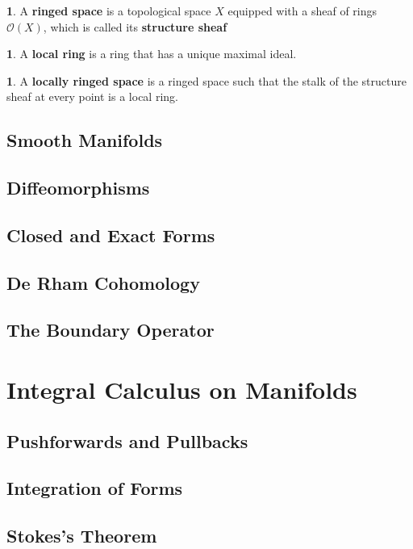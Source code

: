\documentclass[oneside,english]{amsbook}
\numberwithin{section}{chapter}
\theoremstyle{plain}
\theoremstyle{definition}
\newtheorem{defn}[thm]{\protect\definitionname}
\providecommand{\definitionname}{Definition}
\begin{document}
			\begin{defn} 
				A \textbf{ringed space} is a topological space $X$ equipped with a sheaf of rings $\mathscr{O}(X)$, which is called its \textbf{structure sheaf}
			\end{defn}
			
			\begin{defn} 
				A \textbf{local ring} is a ring that has a unique maximal ideal.
			\end{defn}
			
			\begin{defn} 
				A \textbf{locally ringed space} is a ringed space such that the stalk of the structure sheaf at every point is a local ring.
			\end{defn}

		\section{Smooth Manifolds}

		\section{Diffeomorphisms}

		\section{Closed and Exact Forms}
		\section{De Rham Cohomology}
		\section{The Boundary Operator}

	\chapter{Integral Calculus on Manifolds}

		\section{Pushforwards and Pullbacks}
		\section{Integration of Forms}
		\section{Stokes's Theorem}
\end{document}
